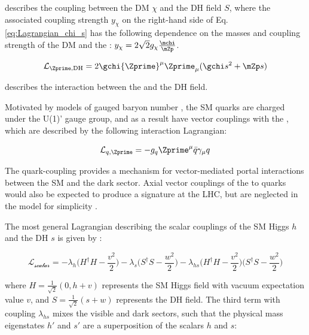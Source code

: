 \noindent describes the coupling between the DM \(\chi\) and the DH field \(S\), where the associated coupling strength \(y_\chi\) on the right-hand side of Eq. \ref{eq:Lagrangian_chi_s} has the following dependence on the masses and coupling strength of the DM and the \Zprime: \(y_\chi = 2\sqrt{2}g_\chi\frac{\mchi}{\mZp}\).

\begin{equation}
\mathcal{L}_{\Zprime, \text{DH}} = 2 \gchi {\Zprime}^{\mu} {\Zprime}_{\mu} (\gchi s^2 + \mZp s)
\end{equation}

\noindent describes the interaction between the \Zprime and the DH field.

Motivated by models of gauged baryon number \cite{Duerr2017,Duerr_2016,baryon_number}, the SM quarks are charged under the U(1)' gauge group, and as a result have vector couplings with the \Zprime, which are described by the following interaction Lagrangian:

\begin{equation}
\label{eq:quark_Zprime_coupling}
\mathcal{L}_{q, \Zprime} = -g_q{\Zprime}^\mu\bar{q}\gamma_\mu q
\end{equation}

\noindent The quark-\Zprime coupling provides a mechanism for vector-mediated portal interactions between the SM and the dark sector. Axial vector couplings of the \Zprime to quarks would also be expected to produce a signature at the LHC, but are neglected in the model for simplicity \cite{Duerr2017}. 

The most general Lagrangian describing the scalar couplings of the SM Higgs \(h\) and the DH \(s\) is given by \cite{DH_SMHiggs_mixing_2016}:
 
 \begin{equation}
 \label{eq:scalar_lagrangian}
 \mathcal{L}_\mathcal{\text{scalar}} = -\lambda_h \Big(H^\dagger H - \frac{v^2}{2}\Big) - \lambda_s \Big(S^\dagger S - \frac{w^2}{2}\Big) - \lambda_{hs} \Big(H^\dagger H - \frac{v^2}{2}\Big) \Big(S^\dagger S - \frac{w^2}{2}\Big)
 \end{equation}
 
\noindent where \(H=\frac{1}{\sqrt{2}}(0, h+v)\) represents the SM Higgs field with vacuum expectation value \(v\), and \(S=\frac{1}{\sqrt{2}}(s+w)\) represents the DH field. The third term with coupling \(\lambda_{hs}\) mixes the visible and dark sectors, such that the physical mass eigenstates \(h'\) and \(s'\) are a superposition of the scalars \(h\) and \(s\):


